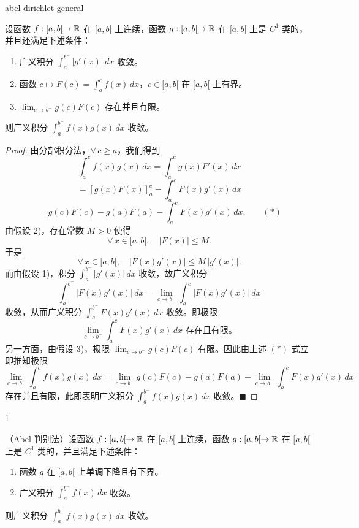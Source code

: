 \begin{mythm}{}{abel-dirichlet-general}

设函数 $f:[a,b[\to\mathbb{R}$ 在 $[a,b[$ 上连续，函数 $g:[a,b[\to\mathbb{R}$ 在 $[a,b[$ 上是 $C^1$ 类的，并且还满足下述条件：

\begin{enumerate}[label=\arabic{enumi})]
\item 广义积分 $\displaystyle\int_a^{b^-}|g'(x)|\,dx$ 收敛。
\item 函数 $c\longmapsto F(c)=\displaystyle\int_a^cf(x)\,dx$，$c\in[a,b[$ 在 $[a,b[$ 上有界。
\item $\displaystyle\lim_{c\to b^-}g(c)F(c)$ 存在并且有限。
\end{enumerate}

则广义积分 $\displaystyle\int_a^{b^-}f(x)g(x)\,dx$ 收敛。

\end{mythm}

\begin{proof}

由分部积分法，$\forall\,c\geqslant a$，我们得到
\[\int_a^cf(x)g(x)\,dx=\int_a^cg(x)F'(x)\,dx\]
\[=\left[g(x)F(x)\right]_a^c-\int_a^cF(x)g'(x)\,dx\]
\[=g(c)F(c)-g(a)F(a)-\int_a^cF(x)g'(x)\,dx.\qquad(*)\]
由假设 2)，存在常数 $M>0$ 使得
\[\forall\,x\in[a,b[,\quad|F(x)|\leqslant M.\]
于是
\[\forall\,x\in[a,b[,\quad|F(x)g'(x)|\leqslant M\,|g'(x)|.\]
而由假设 1)，积分 $\displaystyle\int_a^{b^-}|g'(x)|\,dx$ 收敛，故广义积分
\[\int_a^{b^-}|F(x)g'(x)|\,dx=\lim_{c\to b^-}\int_a^c|F(x)g'(x)|\,dx\]
收敛，从而广义积分 $\displaystyle\int_a^{b^-}F(x)g'(x)\,dx$ 收敛。即极限
\[\lim_{c\to b^-}\int_a^cF(x)g'(x)\,dx\text{ 存在且有限。}\]
另一方面，由假设 3)，极限 $\displaystyle\lim_{c\to b^-}g(c)F(c)$ 有限。因此由上述 $(*)$ 式立即推知极限
\[\lim_{c\to b^-}\int_a^cf(x)g(x)\,dx=\lim_{c\to b^-}g(c)F(c)-g(a)F(a)-\lim_{c\to b^-}\int_a^cF(x)g'(x)\,dx\]
存在并且有限，此即表明广义积分 $\displaystyle\int_a^{b^-}f(x)g(x)\,dx$ 收敛。$\blacksquare$

\end{proof}

\begin{mycor*}{1}

（Abel 判别法）设函数 $f:[a,b[\to\mathbb{R}$ 在 $[a,b[$ 上连续，函数 $g:[a,b[\to\mathbb{R}$ 在 $[a,b[$ 上是 $C^1$ 类的，并且满足下述条件：

\begin{enumerate}[label=\arabic{enumi})]
\item 函数 $g$ 在 $[a,b[$ 上单调下降且有下界。
\item 广义积分 $\displaystyle\int_a^{b^-}f(x)\,dx$ 收敛。
\end{enumerate}

则广义积分 $\displaystyle\int_a^{b^-}f(x)g(x)\,dx$ 收敛。

\end{mycor*}

